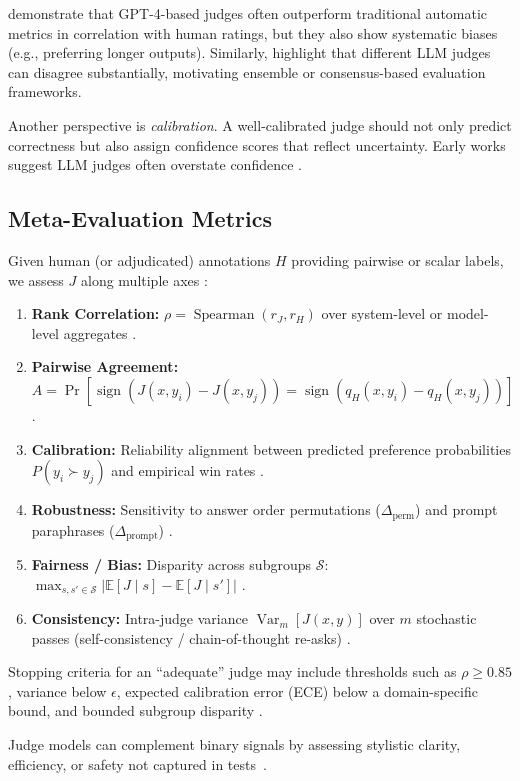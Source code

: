 \citet{fu2023gptscore} demonstrate that GPT-4-based judges often outperform traditional automatic metrics in correlation with human ratings, but they also show systematic biases (e.g., preferring longer outputs). Similarly, \citet{wang2023aligning} highlight that different LLM judges can disagree substantially, motivating ensemble or consensus-based evaluation frameworks.

Another perspective is \textit{calibration}. A well-calibrated judge should not only predict correctness but also assign confidence scores that reflect uncertainty. Early works suggest LLM judges often overstate confidence \citep{zheng2023judgelm}.


\subsection{Meta-Evaluation Metrics}
Given human (or adjudicated) annotations $H$ providing pairwise or scalar labels, we assess $J$ along multiple axes \cite{li2024_llmsasjudges, bavaresco2024judgebench, hada2024metal, liang2022helm}:
\begin{enumerate}
	\item \textbf{Rank Correlation:} $\rho = \operatorname{Spearman}( r_{J}, r_{H})$ over system-level or model-level aggregates \cite{bavaresco2024judgebench, zheng2023judgelm}.
	\item \textbf{Pairwise Agreement:} $A = \Pr[ \operatorname{sign}(J(x,y_i)-J(x,y_j)) = \operatorname{sign}(q_H(x,y_i)-q_H(x,y_j)) ]$ \cite{liu2024pairs, bavaresco2024judgebench}.
	\item \textbf{Calibration:} Reliability alignment between predicted preference probabilities $P(y_i \succ y_j)$ and empirical win rates \cite{stiennon2020learning, ouyang2022training}.
		\item \textbf{Robustness:} Sensitivity to answer order permutations ($\Delta_{\text{perm}}$) and prompt paraphrases ($\Delta_{\text{prompt}}$) \cite{li2024_llmsasjudges, hada2024metal, zheng2023judgelm}.
	\item \textbf{Fairness / Bias:} Disparity across subgroups $\mathcal{S}$: $\max_{s,s' \in \mathcal{S}} | \mathbb{E}[J \mid s] - \mathbb{E}[J \mid s'] |$ \cite{liang2022helm, hada2024metal}.
	\item \textbf{Consistency:} Intra-judge variance $\operatorname{Var}_m[ J(x,y) ]$ over $m$ stochastic passes (self-consistency / chain-of-thought re-asks) \cite{li2024_llmsasjudges}.
\end{enumerate}
Stopping criteria for an ``adequate'' judge may include thresholds such as $\rho \ge 0.85$, variance below $\epsilon$, expected calibration error (ECE) below a domain-specific bound, and bounded subgroup disparity \cite{liang2022helm, bavaresco2024judgebench}.

Judge models can complement binary signals by assessing stylistic clarity, efficiency, or safety not captured in tests~\cite{li2024_llmsasjudges}.